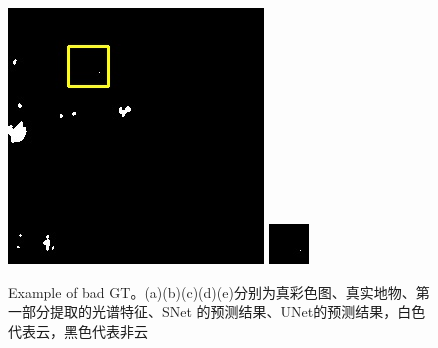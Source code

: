 \documentclass[UTF8]{ctexart}
\begin{document}
\begin{figure}[H]
{\begin{minipage}[b]{0.15\linewidth}
            \includegraphics[width=1\linewidth]{../log/spoon2/cut2/LC81620432014072LGN00_16329_unet.jpg}\vspace{4pt}
            \includegraphics[width=1\linewidth]{../log/spoon2/cut2/tmp_cut_LC81620432014072LGN00_16329_unet.jpg}\vspace{4pt}
        \end{minipage}
    }
\caption{Example of bad GT。(a)(b)(c)(d)(e)分别为真彩色图、真实地物、第一部分提取的光谱特征、SNet
的预测结果、UNet的预测结果，白色代表云，黑色代表非云}
\label{Fig.main2}
\end{figure}
\end{document}
